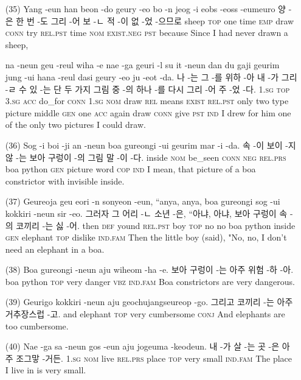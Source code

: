 \begin{itemize}
\item [(35)]
\tgl
		{Yang -eun han beon -do geury -eo bo -n jeog -i eobs -eoss -eumeuro}
		{양 -은 한 번 -도 그리 -어 보 -ㄴ 적 -이 없 -었 -으므로}
		{sheep	\textsc{top}	one	time	\textsc{emp}	draw	\textsc{conn}	try	\textsc{rel.pst}	time	\textsc{nom}	\textsc{exist.neg}	\textsc{pst}	because}
		{Since I had never drawn a sheep,}

\tgl
		{na -neun geu -reul wiha -e nae -ga geuri -l su it -neun dan du gaji geurim jung -ui hana -reul dasi geury -eo ju -eot -da.}
		{나 -는 그 -를 위하 -아 내 -가 그리 -ㄹ 수 있 -는 단 두 가지 그림 중 -의 하나 -를 다시 그리 -어 주 -었 -다.}
		{\textsc{1.sg}	\textsc{top}	\textsc{3.sg}	\textsc{acc}	do\_for	\textsc{conn}	\textsc{1.sg}	\textsc{nom}	draw	\textsc{rel}	means	\textsc{exist}	\textsc{rel.pst}	only	two	type	picture	middle	\textsc{gen}	one	\textsc{acc}	again	draw	\textsc{conn}	give	\textsc{pst}	\textsc{ind}}
		{I drew for him one of the only two pictures I could draw.}
		
\item [(36)]
\tgl
		{Sog -i boi -ji an -neun boa gureongi -ui geurim mar -i -da.}
		{속 -이 보이 -지 않 -는 보아 구렁이 -의 그림 말 -이 -다.}
		{inside	\textsc{nom}	be\_seen	\textsc{conn}	\textsc{neg}	\textsc{rel.prs}	boa	python	\textsc{gen}	picture	word	\textsc{cop}	\textsc{ind}}
		{I mean, that picture of a boa constrictor with invisible inside.}

\item [(37)]
\tgl
		{Geureoja geu eori -n sonyeon -eun, ``anya, anya, boa gureongi sog -ui kokkiri -neun sir -eo.}
		{그러자 그 어리 -ㄴ 소년 -은, ``아냐, 아냐, 보아 구렁이 속 -의 코끼리 -는 싫 -어.}
		{then	\textsc{def}	yound	\textsc{rel.pst}	boy	\textsc{top}	no	no	boa	python	inside	\textsc{gen}	elephant	\textsc{top}	dislike	\textsc{ind.fam}}
		{Then the little boy (said), "No, no, I don't need an elephant in a boa.}

\item [(38)]
\tgl
		{Boa gureongi -neun aju wiheom -ha -e.}
		{보아 구렁이 -는 아주 위험 -하 -아.}
		{boa	python	\textsc{top}	very	danger	\textsc{vbz}	\textsc{ind.fam}}
		{Boa constrictors are very dangerous.}

\item [(39)]
\tgl
		{Geurigo kokkiri -neun aju geochujangseureop -go.}
		{그리고 코끼리 -는 아주 거추장스럽 -고.}
		{and	elephant	\textsc{top}	very	cumbersome	\textsc{conj}}
		{And elephants are too cumbersome.}

\item [(40)]
\tgl
		{Nae -ga sa -neun gos -eun aju jogeuma -keodeun.}
		{내 -가 살 -는 곳 -은 아주 조그맣 -거든.}
		{\textsc{1.sg}	\textsc{nom}	live	\textsc{rel.prs}	place	\textsc{top}	very	small	\textsc{ind.fam}}
		{The place I live in is very small.}


\end{itemize}
